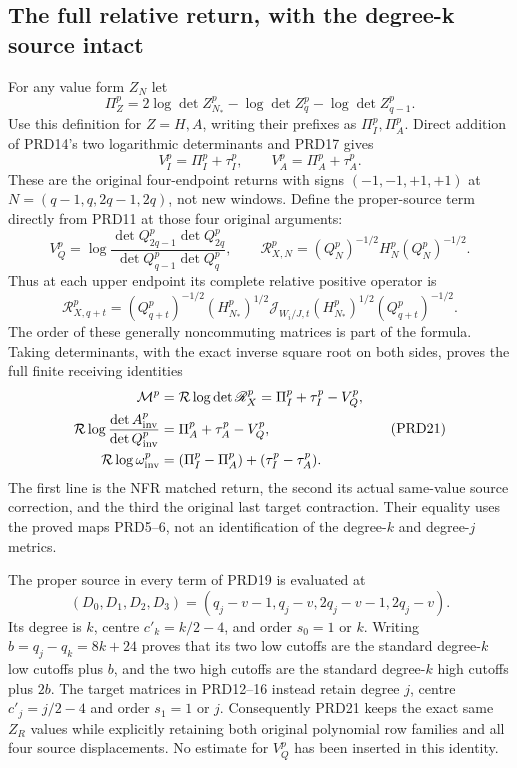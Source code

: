 \subsection{The full relative return, with the degree-k source intact}
For any value form $Z_N$ let
\[
 \Pi_Z^p=2\log\det Z_{N_*}^p-\log\det Z_q^p
                            -\log\det Z_{q-1}^p.
                                                               \tag{PRD17}
\]
Use this definition for $Z=H,A$, writing their prefixes as
$\Pi_I^p,\Pi_A^p$. Direct addition of PRD14's two logarithmic
determinants and PRD17 gives
\[
 V_I^p=\Pi_I^p+\tau_I^p,\qquad
 V_A^p=\Pi_A^p+\tau_A^p.                                \tag{PRD18}
\]
These are the original four-endpoint returns with signs
$(-1,-1,+1,+1)$ at $N=(q-1,q,2q-1,2q)$, not new windows.
Define the proper-source term directly from PRD11 at those four
original arguments:
\[
 V_Q^p=\log\frac{\det Q_{2q-1}^p\det Q_{2q}^p}
                         {\det Q_{q-1}^p\det Q_q^p},
 \qquad \mathscr R_{X,N}^p=(Q_N^p)^{-1/2}H_N^p(Q_N^p)^{-1/2}.
                                                               \tag{PRD19}
\]
Thus at each upper endpoint its complete relative positive operator is
\[
 \mathscr R_{X,q+t}^p
 =(Q_{q+t}^p)^{-1/2}(H_{N_*}^p)^{1/2}
 \mathcal J_{W_i/J,t}(H_{N_*}^p)^{1/2}(Q_{q+t}^p)^{-1/2}.
                                                               \tag{PRD20}
\]
The order of these generally noncommuting matrices is part of the
formula. Taking determinants, with the exact inverse square root
on both sides, proves the full finite receiving identities
\[
\begin{aligned}
 \mathcal M^p&=\mathcal R\log\det\mathscr R_X^p
                 =\Pi_I^p+\tau_I^p-V_Q^p,\\
 \mathcal R\log\frac{\det A_{\rm inv}^p}{\det Q_{\rm inv}^p}
               &=\Pi_A^p+\tau_A^p-V_Q^p,\\
 \mathcal R\log\omega_{\rm inv}^p
               &=(\Pi_I^p-\Pi_A^p)+(\tau_I^p-\tau_A^p).
\end{aligned}                                                    \tag{PRD21}
\]
The first line is the NFR matched return, the second its actual
same-value source correction, and the third the original last
target contraction. Their equality uses the proved maps PRD5--6,
not an identification of the degree-$k$ and degree-$j$ metrics.

The proper source in every term of PRD19 is evaluated at
\[
 (D_0,D_1,D_2,D_3)=(q_j-v-1,q_j-v,2q_j-v-1,2q_j-v).
                                                               \tag{PRD22}
\]
Its degree is $k$, centre $c'_k=k/2-4$, and order $s_0=1$ or $k$.
Writing $b=q_j-q_k=8k+24$ proves that its two low cutoffs are
the standard degree-$k$ low cutoffs plus $b$, and the two high
cutoffs are the standard degree-$k$ high cutoffs plus $2b$.
The target matrices in PRD12--16 instead retain degree $j$,
centre $c'_j=j/2-4$ and order $s_1=1$ or $j$. Consequently
PRD21 keeps the exact same $Z_R$ values while explicitly
retaining both original polynomial row families and all four
source displacements. No estimate for $V_Q^p$ has been inserted
in this identity.


